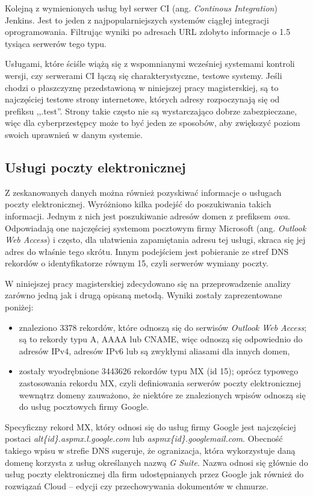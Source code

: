 Kolejną z wymienionych usług był serwer CI (ang. \textit{Continous Integration}) Jenkins. Jest to jeden z najpopularniejszych
systemów ciągłej integracji oprogramowania. Filtrując wyniki po adresach URL zdobyto informacje o 1.5 tysiąca serwerów tego typu.

Usługami, które ściśle wiążą się z wspomnianymi wcześniej systemami kontroli wersji, czy serwerami CI łączą się charakterystyczne,
testowe systemy. Jeśli chodzi o płaszczyznę przedstawioną w niniejszej pracy magisterskiej, są to najczęściej testowe strony
internetowe, których adresy rozpoczynają się od prefiksu ,,.test''. Strony takie często nie są wystarczająco dobrze zabezpieczane,
więc dla cyberprzestępcy może to być jeden ze sposobów, aby zwiększyć poziom swoich uprawnień w danym systemie.

\subsection{Usługi poczty elektronicznej}
\noindent Z zeskanowanych danych można również pozyskiwać informacje o usługach poczty elektronicznej. Wyróżniono kilka podejść do
poszukiwania takich informacji. Jednym z nich jest poszukiwanie adresów domen z prefiksem \textit{owa}.
Odpowiadają one najczęściej systemom pocztowym firmy Microsoft (ang. \textit{Outlook Web Access}) i często, dla ułatwienia
zapamiętania adresu tej usługi, skraca się jej adres do właśnie tego skrótu. Innym podejściem jest pobieranie ze stref DNS rekordów
o identyfikatorze równym 15, czyli serwerów wymiany poczty.

W niniejszej pracy magisterskiej zdecydowano się na przeprowadzenie analizy zarówno jedną jak i drugą opisaną metodą. Wyniki zostały
zaprezentowane poniżej:
\begin{itemize}
		\item znaleziono 3378 rekordów, które odnoszą się do serwisów \textit{Outlook Web Access}; są to rekordy typu A, AAAA lub
		CNAME, więc odnoszą się odpowiednio do adresów IPv4, adresów IPv6 lub są zwykłymi aliasami dla innych domen,
		\item zostały wyodrębnione 3443626 rekordów typu MX (id 15); oprócz typowego zastosowania rekordu MX, czyli definiowania
		serwerów poczty elektronicznej wewnątrz domeny zauważono, że niektóre ze znalezionych wpisów odnoszą się do usług pocztowych
		firmy Google.
\end{itemize}

Specyficzny rekord MX, który odnosi się do usług firmy Google jest najczęściej postaci \textit{alt\{id\}.aspmx.l.google.com} lub
\textit{aspmx\{id\}.googlemail.com}. Obecność takiego wpisu w strefie DNS sugeruje, że ogranizacja, która wykorzystuje daną domenę
korzysta z usług określanych nazwą \textit{G Suite}. Nazwa odnosi się głównie do usług poczty elektronicznej dla firm udostępnianych
przez Google jak również do rozwiązań Cloud -- edycji czy przechowywania dokumentów w chmurze.


